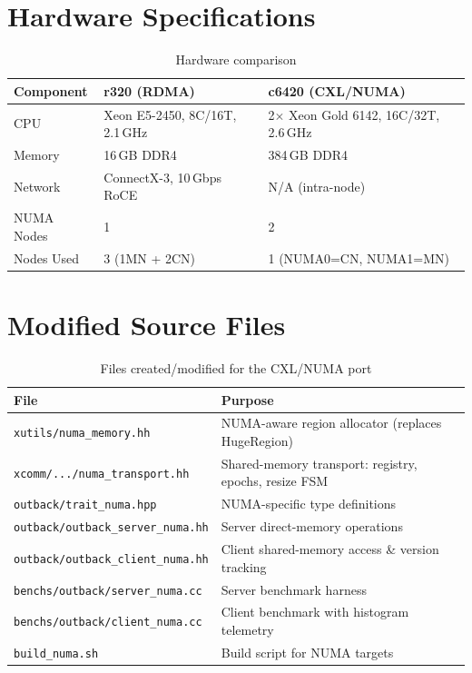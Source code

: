 \documentclass[conference]{IEEEtran}
\begin{document}
\appendices
\section{Hardware Specifications}

\begin{table}[H]
\centering
\caption{Hardware comparison}
\label{tab:hw}
\begin{tabular}{@{}lll@{}}
\toprule
\textbf{Component} & \textbf{r320 (RDMA)} & \textbf{c6420 (CXL/NUMA)} \\
\midrule
CPU & Xeon E5-2450, 8C/16T, 2.1\,GHz & 2$\times$ Xeon Gold 6142, 16C/32T, 2.6\,GHz \\
Memory & 16\,GB DDR4 & 384\,GB DDR4 \\
Network & ConnectX-3, 10\,Gbps RoCE & N/A (intra-node) \\
NUMA Nodes & 1 & 2 \\
Nodes Used & 3 (1MN + 2CN) & 1 (NUMA0=CN, NUMA1=MN) \\
\bottomrule
\end{tabular}
\end{table}

\section{Modified Source Files}

\begin{table}[H]
\centering
\caption{Files created/modified for the CXL/NUMA port}
\label{tab:files}
\small
\begin{tabular}{@{}lp{8cm}@{}}
\toprule
\textbf{File} & \textbf{Purpose} \\
\midrule
\texttt{xutils/numa\_memory.hh} & NUMA-aware region allocator (replaces HugeRegion) \\
\texttt{xcomm/.../numa\_transport.hh} & Shared-memory transport: registry, epochs, resize FSM \\
\texttt{outback/trait\_numa.hpp} & NUMA-specific type definitions \\
\texttt{outback/outback\_server\_numa.hh} & Server direct-memory operations \\
\texttt{outback/outback\_client\_numa.hh} & Client shared-memory access \& version tracking \\
\texttt{benchs/outback/server\_numa.cc} & Server benchmark harness \\
\texttt{benchs/outback/client\_numa.cc} & Client benchmark with histogram telemetry \\
\texttt{build\_numa.sh} & Build script for NUMA targets \\
\bottomrule
\end{tabular}
\end{table}
\end{document}
